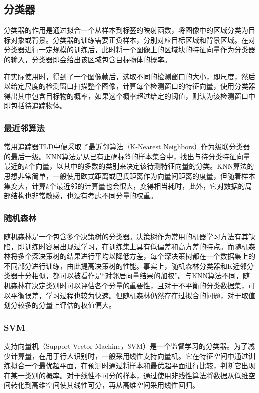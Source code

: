 \subsection{分类器}

  分类器的作用是通过拟合一个从样本到标签的映射函数，将图像中的区域分类为目标对象或背景。分类器的训练需要正负样本，分别对应目标区域和背景区域。在对分类器进行一定规模的训练后，此时将一个图像上的区域块的特征向量作为分类器的输入，分类器即会给出该区域包含目标物体的概率。

  在实际使用时，得到了一个图像帧后，选取不同的检测窗口的大小，即尺度，然后以给定尺度的检测窗口扫描整个图像，计算每个检测窗口的特征向量，使用分类器得出其中包含目标物的概率，如果这个概率超过给定的阈值，则认为该检测窗口中即包括待追踪物体。

\subsubsection{最近邻算法}
  常用追踪器TLD中便采取了最近邻算法（K-Nearest Neighbors）作为级联分类器的最后一级。KNN算法是从已有正确标签的样本集合中，找出与待分类特征向量最近的$k$个向量，以其中的多数的类别来决定该待测特征向量的分类。KNN算法的思想非常简单，一般使用欧式距离或巴氏距离作为向量间距离的度量，但随着样本集变大，计算$k$个最近邻的计算量也会很大，变得相当耗时，此外，它对数据的局部结构也非常敏感，也没有考虑不同分量的权重。

\subsubsection{随机森林}
  随机森林是一个包含多个决策树的分类器。决策树作为常用的机器学习方法有其缺陷，即训练时容易出现过学习，在训练集上具有低偏差和高方差的特点。而随机森林将多个深决策树的结果进行平均以降低方差，每个深决策树都在一个数据集上的不同部分进行训练，由此提高决策树的性能。事实上，随机森林分类器和K近邻分类器十分相似，都可以被看作是“对邻居向量结果的加权”。与KNN算法不同，随机森林在决定类别时可以评估各个分量的重要性，且对于不平衡的分类数据集，可以平衡误差，学习过程也较为快速。但随机森林仍然存在过拟合的问题，对于取值划分较多的分量上评估的权值偏大。

\subsubsection{SVM}

  支持向量机（Support Vector Machine，SVM）是一个监督学习的分类器。为了减少计算量，在用于行人识别时，一般采用线性支持向量机。它在特征空间中通过训练拟合一个最优超平面，在预测时通过将样本和最优超平面进行比较，判断它出现在某一类别的概率。对于线性不可分的样本，通过使用非线性算法将数据从低维空间转化到高维空间使其线性可分，再从高维空间采用线性回归。

